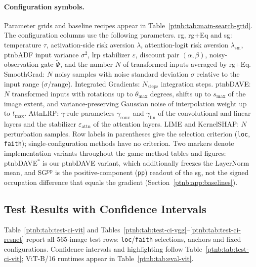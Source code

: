 \paragraph{Configuration symbols.}\label{ptnb:app:config-symbols}
Parameter grids and baseline recipes appear in Table~\ref{ptnb:tab:main-search-grid}. The configuration columns use the following parameters. \ac{rg}, \ac{rg}+Eq and \ac{sg}: temperature $\tau$, activation-side risk aversion $\lambda$, attention-logit risk aversion $\lambda_{\mathrm{sm}}$, \ac{ptnbADF} input variance $\sigma^2$, \ac{lrp} stabilizer $\varepsilon$, discount pair $(\alpha,\beta)$, noisy-observation gate $\tilde\Phi$, and the number $N$ of transformed inputs averaged by \ac{rg}+Eq. SmoothGrad: $N$ noisy samples with noise standard deviation $\sigma$ relative to the input range ($\sigma/\mathrm{range}$). Integrated Gradients: $N_{\mathrm{steps}}$ integration steps. \ac{ptnbDAVE}: $N$ transformed inputs with rotations up to $\theta_{\max}$ degrees, shifts up to $s_{\max}$ of the image extent, and variance-preserving Gaussian noise of interpolation weight up to $t_{\max}$. AttnLRP: $\gamma$-rule parameters $\gamma_{\mathrm{conv}}$ and $\gamma_{\mathrm{lin}}$ of the convolutional and linear layers and the stabilizer $\varepsilon_{\mathrm{attn}}$ of the attention layers. LIME and KernelSHAP: $N$ perturbation samples. Row labels in parentheses give the selection criterion (\texttt{loc}, \texttt{faith}); single-configuration methods have no criterion. Two markers denote implementation variants throughout the game-method tables and figures: \acs{ptnbDAVE}$^{*}$ is our \ac{ptnbDAVE} variant, which additionally freezes the LayerNorm mean, and SG$^{\mathrm{pp}}$ is the positive-component (\texttt{pp}) readout of the \ac{sg}, not the signed occupation difference that equals the gradient (Section~\ref{ptnb:app:baselines}).

\subsection{Test Results with Confidence Intervals}\label{ptnb:app:test-ci}

Table~\ref{ptnb:tab:test-ci-vit} and Tables~\ref{ptnb:tab:test-ci-vgg}--\ref{ptnb:tab:test-ci-resnet} report all 565-image test rows: \texttt{loc}/\texttt{faith} selections, anchors and fixed configurations. Confidence intervals and highlighting follow Table~\ref{ptnb:tab:test-ci-vit}; ViT-B/16 runtimes appear in Table~\ref{ptnb:tab:eval-vit}.


